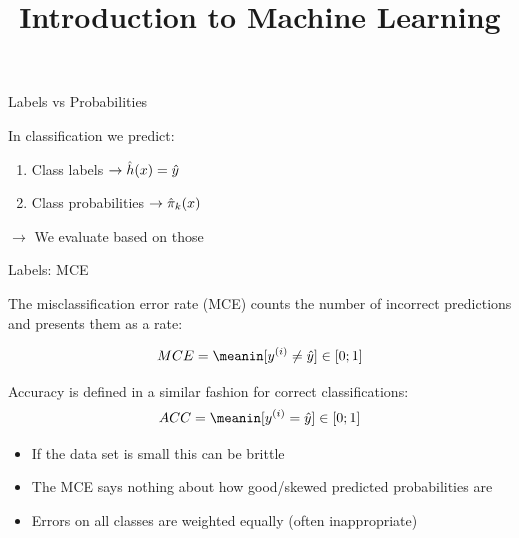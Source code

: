 




\newcommand{\titlefigure}{figure_man/conf_matrix.png}
\newcommand{\learninggoals}{
\item Know the definitions of misclassification error rate (MCE) and accuracy (ACC)
\item Understand the entries of a confusion matrix
\item Understand the idea of costs
\item Know defintions of Brier score and log loss
}



\title{Introduction to Machine Learning}
\date{}





\begin{vbframe}{Labels vs Probabilities}

\lz
In classification we predict:

\lz
\begin{enumerate}
\item Class labels $\rightarrow \hat{h}(x) = \hat{y}$
\item Class probabilities $\rightarrow \hat \pi_k(x)$
\end{enumerate}

\lz
$\rightarrow$ We evaluate based on those


\end{vbframe}

\begin{vbframe}{Labels: MCE}

The misclassification error rate (MCE) counts the number of incorrect predictions and presents them as a rate:

\[
MCE = \meanin [\yi \neq \yih] \in [0;1]
\]

Accuracy is defined in a similar fashion for correct classifications:
\[
ACC = \meanin [\yi = \yih] \in [0;1]
\]

\begin{itemize}
\item If the data set is small this can be brittle
\item The MCE says nothing about how good/skewed predicted probabilities are
\item Errors on all classes are weighted equally (often inappropriate)
\end{itemize}
\end{vbframe}





